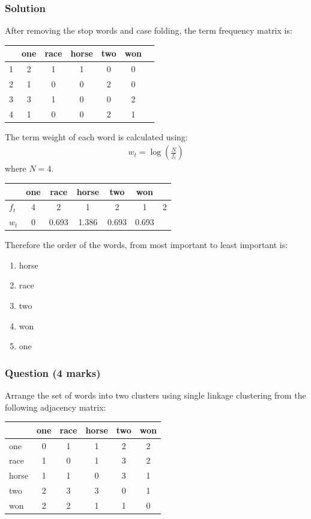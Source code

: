 \documentclass[a4paper,oneside]{book}
\begin{document}
\subsubsection*{Solution}

After removing the stop words and case folding, the term frequency matrix is:
\begin{center}
\begin{tabular}{lcccccc}
\hline
  & one & race & horse & two & won \\
\hline
1 & 2 & 1 & 1 & 0 & 0 \\
2 & 1 & 0 & 0 & 2 & 0 \\
3 & 3 & 1 & 0 & 0 & 2 \\
4 & 1 & 0 & 0 & 2 & 1 \\
\hline
\end{tabular}
\end{center}
The term weight of each word is calculated using:
\begin{align*}
  w_t = \log{\left (\frac{N}{f_t}\right )}
\end{align*}
where $N = 4$.
\begin{center}
\begin{tabular}{lcccccc}
\hline
  & one & race & horse & two & won \\
\hline
$f_t$ & 4 & 2 & 1 & 2 & 1 & 2 \\
$w_t$ & 0 & 0.693 & 1.386 & 0.693 & 0.693 \\
\hline
\end{tabular}
\end{center}
Therefore the order of the words, from most important to least important is:
\begin{enumerate}
\item horse
\item race 
\item two 
\item won 
\item one
\end{enumerate}


\subsubsection*{Question (4 marks)}

Arrange the set of words into two clusters using single linkage clustering from the following adjacency matrix:
\begin{center}
\begin{tabular}{lccccc}
\hline
  & one & race & horse & two & won \\
\hline
one   & 0 & 1 & 1 & 2 & 2 \\
race  & 1 & 0 & 1 & 3 & 2 \\
horse & 1 & 1 & 0 & 3 & 1 \\
two   & 2 & 3 & 3 & 0 & 1 \\
won   & 2 & 2 & 1 & 1 & 0 \\
\hline
\end{tabular}
\end{center}
\end{document}
